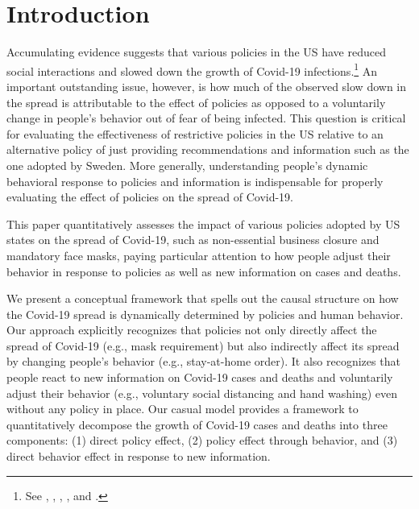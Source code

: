 \documentclass[3p, longtitle]{elsarticle}
\theoremstyle{definition}
\begin{document}

\maketitle






 \section{Introduction}


Accumulating evidence suggests that various policies in the US have reduced social interactions and slowed down the growth of Covid-19  infections.\footnote{
See
\citet{courtemanche2020}, \citet{hsiang2020}, \citet{pei2020},  \citet{abouk2020}, and \cite{wright2020}.} An important outstanding issue, however, is how much of the observed slow down in the spread is attributable to the effect of policies as opposed to a voluntarily change in people's behavior out of fear of being infected. This question is critical for evaluating the effectiveness of restrictive policies  in the US relative to an alternative policy of just providing recommendations and information such as the one adopted by Sweden.  More generally, understanding people's dynamic  behavioral response to policies and information  is indispensable for properly evaluating the effect of policies on the spread of Covid-19.


This paper  quantitatively assesses the impact of various policies adopted by US states on the spread of Covid-19, such as non-essential business closure and mandatory  face masks, paying particular attention to how people adjust their behavior in response to policies as well as new information on cases and deaths.

We present a conceptual framework that spells out the causal structure on how the Covid-19 spread is dynamically determined by policies and human behavior. Our approach explicitly recognizes that policies not only directly affect the spread of Covid-19 (e.g., mask requirement) but also indirectly affect its spread by changing people's behavior (e.g., stay-at-home order). It also recognizes that people react to new information on Covid-19 cases and deaths and voluntarily adjust their behavior (e.g., voluntary social distancing and hand washing) even without any policy in place. Our casual model provides a framework to quantitatively decompose the growth of Covid-19 cases and deaths into three components: (1) direct policy effect, (2) policy effect through behavior, and (3) direct behavior effect in response to new information.
\end{document}
